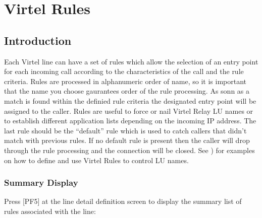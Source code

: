 \documentclass[letterpaper,10pt,english]{sphinxmanual}
\begin{document}
\ignorespaces 

\chapter{Virtel Rules}
\label{\detokenize{connectivity_guide:virtel-rules}}\label{\detokenize{connectivity_guide:v461cn-virtelrules}}\label{\detokenize{connectivity_guide:index-90}}

\section{Introduction}
\label{\detokenize{connectivity_guide:id43}}
Each Virtel line can have a set of rules which allow the selection of an entry point for each incoming call according to the characteristics of the call and the rule criteria. Rules are processed in alphanumeric order of name, so it is important that the name you choose gaurantees order of the rule processing. As sonn as a match is found within the definied rule criteria the designated entry point will be assigned to the caller. Rules are useful to force or nail Virtel Relay LU names or to establish different application lists depending on the incoming IP address. The last rule should be the “default” rule which is used to catch callers that didn’t match with previous rules. If no default rule is present then the caller will drop through the rule processing and the connection will be closed. See {\hyperref[\detokenize{connectivity_guide:v461cn-forceluname}]{}}) for examples on how to define and use Virtel Rules to control LU names.

\ignorespaces 

\subsection{Summary Display}
\label{\detokenize{connectivity_guide:index-91}}\label{\detokenize{connectivity_guide:id44}}
Press {[}PF5{]} at the line detail definition screen to display the summary list of rules associated with the line:

\end{document}
